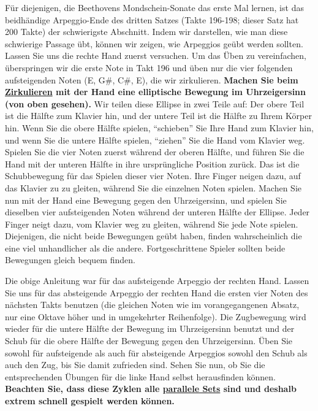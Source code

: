 Für diejenigen, die Beethovens Mondschein-Sonate das erste Mal lernen, ist das beidhändige Arpeggio-Ende des dritten Satzes (Takte 196-198; dieser Satz hat 200 Takte) der schwierigste Abschnitt.
Indem wir darstellen, wie man diese schwierige Passage übt, können wir zeigen, wie Arpeggios geübt werden sollten.
Lassen Sie uns die rechte Hand zuerst versuchen.
Um das Üben zu vereinfachen, überspringen wir die erste Note in Takt 196 und üben nur die vier folgenden aufsteigenden Noten (E, G\#, C\#, E), die wir zirkulieren.
\textbf{Machen Sie beim \hyperref[c1iii2]{Zirkulieren} mit der Hand eine elliptische Bewegung im Uhrzeigersinn (von oben gesehen).}
Wir teilen diese Ellipse in zwei Teile auf: Der obere Teil ist die Hälfte zum Klavier hin, und der untere Teil ist die Hälfte zu Ihrem Körper hin.
Wenn Sie die obere Hälfte spielen, \enquote{schieben} Sie Ihre Hand zum Klavier hin, und wenn Sie die untere Hälfte spielen, \enquote{ziehen} Sie die Hand vom Klavier weg.
Spielen Sie die vier Noten zuerst während der oberen Hälfte, und führen Sie die Hand mit der unteren Hälfte in ihre ursprüngliche Position zurück.
Das ist die Schubbewegung für das Spielen dieser vier Noten.
Ihre Finger neigen dazu, auf das Klavier zu zu gleiten, während Sie die einzelnen Noten spielen.
Machen Sie nun mit der Hand eine Bewegung gegen den Uhrzeigersinn, und spielen Sie dieselben vier aufsteigenden Noten während der unteren Hälfte der Ellipse.
Jeder Finger neigt dazu, vom Klavier weg zu gleiten, während Sie jede Note spielen.
Diejenigen, die nicht beide Bewegungen geübt haben, finden wahrscheinlich die eine viel unhandlicher als die andere.
Fortgeschrittene Spieler sollten beide Bewegungen gleich bequem finden.

Die obige Anleitung war für das aufsteigende Arpeggio der rechten Hand.
Lassen Sie uns für das absteigende Arpeggio der rechten Hand die ersten vier Noten des nächsten Takts benutzen (die gleichen Noten wie im vorangegangenen Absatz, nur eine Oktave höher und in umgekehrter Reihenfolge).
Die Zugbewegung wird wieder für die untere Hälfte der Bewegung im Uhrzeigersinn benutzt und der Schub für die obere Hälfte der Bewegung gegen den Uhrzeigersinn.
Üben Sie sowohl für aufsteigende als auch für absteigende Arpeggios sowohl den Schub als auch den Zug, bis Sie damit zufrieden sind.
Sehen Sie nun, ob Sie die entsprechenden Übungen für die linke Hand selbst herausfinden können.
\textbf{Beachten Sie, dass diese Zyklen alle \hyperref[c1ii11]{parallele Sets} sind und deshalb extrem schnell gespielt werden können.}

